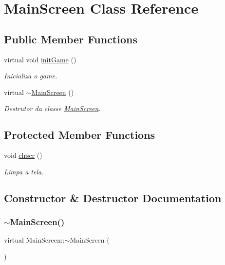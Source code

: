 \hypertarget{class_main_screen}{}\section{Main\+Screen Class Reference}
\label{class_main_screen}
\subsection*{Public Member Functions}
\begin{DoxyCompactItemize}
\item 
virtual void \mbox{\hyperlink{class_main_screen_a26e54b5922d5ffec7483309a14d0f55a}{init\+Game}} ()
\begin{DoxyCompactList}\small\item\em Inicializa o game. \end{DoxyCompactList}\item 
virtual \mbox{\hyperlink{class_main_screen_a9485c4c0e8cfdda86f385cc6096154e3}{$\sim$\+Main\+Screen}} ()
\begin{DoxyCompactList}\small\item\em Destrutor da classe \mbox{\hyperlink{class_main_screen}{Main\+Screen}}. \end{DoxyCompactList}\end{DoxyCompactItemize}
\subsection*{Protected Member Functions}
\begin{DoxyCompactItemize}
\item 
void \mbox{\hyperlink{class_main_screen_ac3fa0644a44436d74b96c68064edbcb4}{clrscr}} ()
\begin{DoxyCompactList}\small\item\em Limpa a tela. \end{DoxyCompactList}\end{DoxyCompactItemize}


\subsection{Constructor \& Destructor Documentation}
\mbox{\label{class_main_screen_a9485c4c0e8cfdda86f385cc6096154e3}} 
\subsubsection{\texorpdfstring{$\sim$MainScreen()}{~MainScreen()}}
{\footnotesize\ttfamily virtual Main\+Screen\+::$\sim$\+Main\+Screen (\begin{DoxyParamCaption}{ }\end{DoxyParamCaption})\hspace{0.3cm}{\ttfamily [virtual]}}



